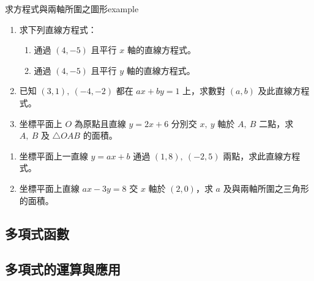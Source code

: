 \documentclass[bwprint,a4paper]{extarticle}
\begin{document}
\newpage
\begin{question}{求方程式與兩軸所圍之圖形}{example}
	\begin{enumerate}
		\item 求下列直線方程式：
		\begin{enumerate}[label=(\arabic*)]
			\item 通過 $(4,-5)$ 且平行 $x$ 軸的直線方程式。	  
			\item 通過 $(4,-5)$ 且平行 $y$ 軸的直線方程式。
		\end{enumerate}	
		\item 已知 $(3,1),\ (-4,-2)$ 都在 $ax+by=1$ 上，求數對 $(a,b)$ 及此直線方程式。
		\item 坐標平面上 $O$ 為原點且直線 $y=2x+6$ 分別交 $x,\ y$ 軸於 $A,\ B$ 二點，求 $A,\ B$ 及 $\bigtriangleup OAB$ 的面積。
	\end{enumerate}
\end{question}
\vspace{45ex}
\begin{observing}
	\begin{enumerate}
		\item 坐標平面上一直線 $y=ax+b$ 通過 $(1,8),\ (-2,5)$ 兩點，求此直線方程式。 
		\item 坐標平面上直線 $ax-3y=8$ 交 $x$ 軸於 $(2,0)$，求 $a$ 及與兩軸所圍之三角形的面積。
	\end{enumerate}
\end{observing}
\newpage

\begin{center}
	\section{多項式函數}
\end{center}

\subsection{多項式的運算與應用}
\end{document}
